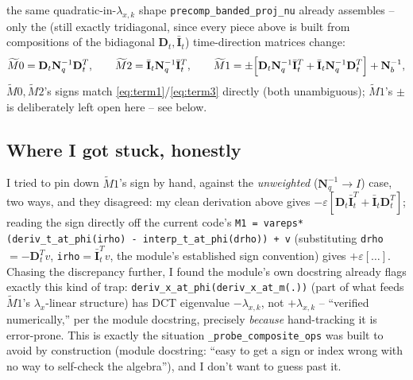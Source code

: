 \documentclass[11pt]{article}
\newcommand{\code}[1]{\texttt{#1}}
\begin{document}
the same quadratic-in-$\lambda_{x,k}$ shape \code{precomp\_banded\_proj\_nu} already
assembles -- only the (still exactly tridiagonal, since every piece above is built from
compositions of the bidiagonal $\mathbf D_t,\bar{\mathbf I}_t$) time-direction matrices
change:
\begin{equation}
  \label{eq:M-weighted}
  \widetilde M0 = \mathbf D_t\mathbf N_q^{-1}\mathbf D_t^T, \qquad
  \widetilde M2 = \bar{\mathbf I}_t\mathbf N_q^{-1}\bar{\mathbf I}_t^T, \qquad
  \widetilde M1 = \pm\Bigl[\mathbf D_t\mathbf N_q^{-1}\bar{\mathbf I}_t^T+\bar{\mathbf I}_t
  \mathbf N_q^{-1}\mathbf D_t^T\Bigr] + \mathbf N_b^{-1},
\end{equation}
$\widetilde M0,\widetilde M2$'s signs match \eqref{eq:term1}/\eqref{eq:term3} directly
(both unambiguous); $\widetilde M1$'s $\pm$ is deliberately left open here -- see below.

\subsection*{Where I got stuck, honestly}

I tried to pin down $\widetilde M1$'s sign by hand, against the \emph{unweighted}
($\mathbf N_q^{-1}\to I$) case, two ways, and they disagreed: my clean derivation
above gives $-\varepsilon[\mathbf D_t\bar{\mathbf I}_t^T+\bar{\mathbf I}_t\mathbf D_t^T]$;
reading the sign directly off the current code's \code{M1 = vareps*(deriv\_t\_at\_phi(irho)
- interp\_t\_at\_phi(drho)) + v} (substituting \code{drho}$=-\mathbf D_t^Tv$,
\code{irho}$=\bar{\mathbf I}_t^Tv$, the module's established sign convention) gives
$+\varepsilon[\ldots]$. Chasing the discrepancy further, I found the module's own
docstring already flags exactly this kind of trap: \code{deriv\_x\_at\_phi(deriv\_x\_at\_m(.))}
(part of what feeds $\widetilde M1$'s $\lambda_x$-linear structure) has DCT eigenvalue
\emph{$-\lambda_{x,k}$}, not $+\lambda_{x,k}$ -- ``verified numerically,'' per the module
docstring, precisely \emph{because} hand-tracking it is error-prone. This is exactly the
situation \code{\_probe\_composite\_ops} was built to avoid by construction (module
docstring: ``easy to get a sign or index wrong with no way to self-check the
algebra''), and I don't want to guess past it.
\end{document}
